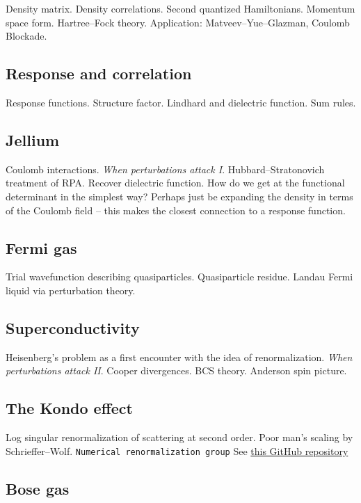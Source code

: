 Density matrix. Density correlations. Second quantized Hamiltonians. Momentum space form. Hartree--Fock theory. Application: Matveev--Yue--Glazman, Coulomb Blockade. 

\subsection{Response and correlation}

Response functions. Structure factor. Lindhard and dielectric function. Sum rules.

\subsection{Jellium}

Coulomb interactions. \emph{When perturbations attack I}. Hubbard--Stratonovich treatment of RPA. Recover dielectric function. How do we get at the functional determinant in the simplest way? Perhaps just be expanding the density in terms of the Coulomb field -- this makes the closest connection to a response function.

\subsection{Fermi gas}

Trial wavefunction describing quasiparticles. Quasiparticle residue. Landau Fermi liquid via perturbation theory. 

\subsection{Superconductivity}

Heisenberg's problem as a first encounter with the idea of renormalization. \emph{When perturbations attack II}. Cooper divergences. BCS theory. Anderson spin picture.

\subsection{The Kondo effect}

Log singular renormalization of scattering at second order. Poor man's scaling by Schrieffer--Wolf. \verb|Numerical renormalization group| See \href{https://github.com/LucasNogueiraMartins/NRG-Didactic}{this GitHub repository}

\subsection{Bose gas}

